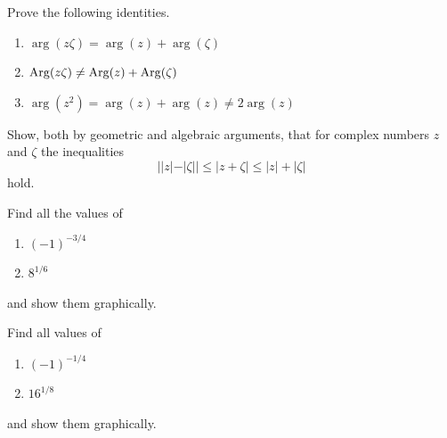 {%
\begin{Exercise}
  \label{exercise argument identities}
  Prove the following identities.
  \begin{enumerate}
  \item
    $\arg(z \zeta) = \arg(z) + \arg(\zeta)$
  \item
    $\mathop{\mathrm{Arg}}\nolimits(z \zeta) \neq \mathop{\mathrm{Arg}}\nolimits(z) + \mathop{\mathrm{Arg}}\nolimits(\zeta)$
  \item
    $\arg \left( z^2 \right) = \arg(z) + \arg(z) \neq 2 \arg(z)$
  \end{enumerate}

\end{Exercise}




\begin{Exercise}
  \label{exercise triangle inequalities}
  Show, both by geometric and algebraic arguments, that
  for complex numbers $z$ and $\zeta$ the inequalities
  \[
  ||z|-|\zeta||\leq |z + \zeta|\leq |z| + |\zeta|
  \]
  hold.

\end{Exercise}





\begin{Exercise}
  \label{exercise -1 -3/4 8 1/6}
  Find all the values of
  \begin{enumerate}
  \item
    $(- 1)^{-3/4}$
  \item
    $8^{1/6}$
  \end{enumerate}
  and show them graphically.

\end{Exercise}







\begin{Exercise}
  \label{exercise 16 1/8}
  Find all values of
  \begin{enumerate}
  \item
    $ \displaystyle
    (- 1)^{-1/4}
    $
  \item
    $ \displaystyle
    16^{1/8}
    $
  \end{enumerate}
  and show them graphically.

\end{Exercise}



}

